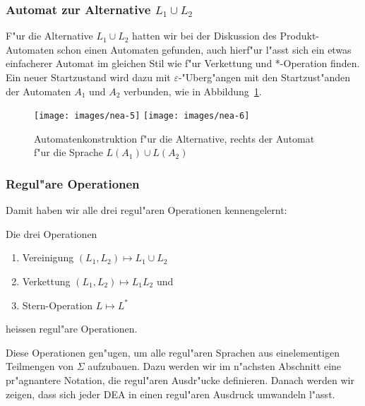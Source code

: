 \subsubsection{Automat zur Alternative $L_1\cup L_2$}
F"ur die Alternative $L_1\cup L_2$ hatten wir bei der Diskussion
des Produkt-Automaten schon einen Automaten gefunden, auch
hierf"ur l"asst sich ein etwas einfacherer Automat im gleichen
Stil wie f"ur Verkettung und *-Operation finden. Ein neuer Startzustand
wird dazu mit $\varepsilon$-"Uberg"angen mit den Startzust"anden
der Automaten $A_1$ und $A_2$ verbunden, wie in Abbildung~\ref{neaalternative}.
\begin{figure}
\begin{center}
\texttt{[image: images/nea-5]}
\qquad
\qquad
\texttt{[image: images/nea-6]}
\end{center}
\caption{Automatenkonstruktion f"ur die Alternative, rechts der Automat
f"ur die Sprache $L(A_1)\cup L(A_2)$\label{neaalternative}}
\end{figure}

\subsubsection{Regul"are Operationen}
Damit haben wir alle drei regul"aren Operationen kennengelernt:

\begin{definition}
Die drei Operationen
\begin{enumerate}
\item Vereinigung $(L_1,L_2)\mapsto L_1\cup L_2$
\item Verkettung $(L_1,L_2)\mapsto L_1L_2$ und
\item Stern-Operation $L\mapsto L^*$
\end{enumerate}
heissen regul"are Operationen.
\end{definition}

Diese Operationen gen"ugen, um alle regul"aren Sprachen aus
einelementigen Teilmengen von $\Sigma$ aufzubauen.
Dazu werden wir im n"achsten Abschnitt eine pr"agnantere Notation,
die regul"aren Ausdr"ucke definieren. Danach werden wir zeigen,
dass sich jeder DEA in einen regul"aren Ausdruck umwandeln l"asst.


